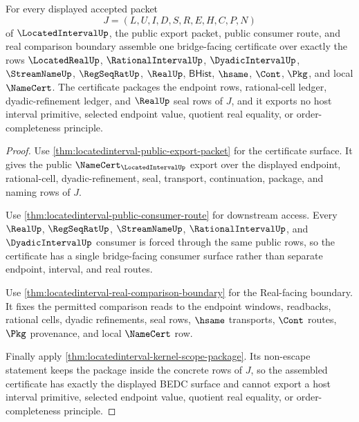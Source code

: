 \begin{theorem}
\label{thm:locatedinterval-bridge-facing-certificate-package}
For every displayed accepted packet
$$
J=(L,U,I,D,S,R,E,H,C,P,N)
$$
of $\LocatedIntervalUp$, the public export packet, public consumer route, and real comparison boundary assemble one bridge-facing certificate over exactly the rows $\LocatedRealUp$, $\RationalIntervalUp$, $\DyadicIntervalUp$, $\StreamNameUp$, $\RegSeqRatUp$, $\RealUp$, $\mathsf{BHist}$, $\hsame$, $\Cont$, $\Pkg$, and local $\NameCert$. The certificate packages the endpoint rows, rational-cell ledger, dyadic-refinement ledger, and $\RealUp$ seal rows of $J$, and it exports no host interval primitive, selected endpoint value, quotient real equality, or order-completeness principle.
\end{theorem}
\begin{proof}
Use \autoref{thm:locatedinterval-public-export-packet} for the certificate surface. It gives the public $\NameCert_{\LocatedIntervalUp}$ export over the displayed endpoint, rational-cell, dyadic-refinement, seal, transport, continuation, package, and naming rows of $J$.

Use \autoref{thm:locatedinterval-public-consumer-route} for downstream access. Every $\RealUp$, $\RegSeqRatUp$, $\StreamNameUp$, $\RationalIntervalUp$, and $\DyadicIntervalUp$ consumer is forced through the same public rows, so the certificate has a single bridge-facing consumer surface rather than separate endpoint, interval, and real routes.

Use \autoref{thm:locatedinterval-real-comparison-boundary} for the Real-facing boundary. It fixes the permitted comparison reads to the endpoint windows, readbacks, rational cells, dyadic refinements, seal rows, $\hsame$ transports, $\Cont$ routes, $\Pkg$ provenance, and local $\NameCert$ row.

Finally apply \autoref{thm:locatedinterval-kernel-scope-package}. Its non-escape statement keeps the package inside the concrete rows of $J$, so the assembled certificate has exactly the displayed BEDC surface and cannot export a host interval primitive, selected endpoint value, quotient real equality, or order-completeness principle.
\end{proof}

